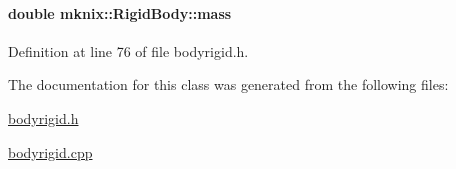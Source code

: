 \hypertarget{classmknix_1_1_rigid_body_af9643b668fbafd10ffd392b8aebdae5e}{}
\paragraph[{mass}]{\setlength{\rightskip}{0pt plus 5cm}double mknix\+::\+Rigid\+Body\+::mass\hspace{0.3cm}{\ttfamily [protected]}}\label{classmknix_1_1_rigid_body_af9643b668fbafd10ffd392b8aebdae5e}


Definition at line 76 of file bodyrigid.\+h.



The documentation for this class was generated from the following files\+:\begin{DoxyCompactItemize}
\item 
\hyperlink{bodyrigid_8h}{bodyrigid.\+h}\item 
\hyperlink{bodyrigid_8cpp}{bodyrigid.\+cpp}\end{DoxyCompactItemize}
